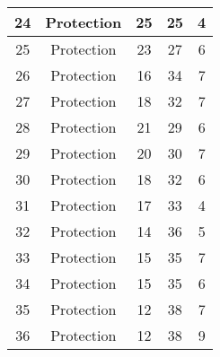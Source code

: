 \documentclass[results.tex]{subfiles}
\begin{document}
\begin{center}
\begin{tabular}{| c || c | c | c | c |}
            \hline
            24                      & Protection                   & 25                     & 25                      & 4                    \\
            \hline
            25                      & Protection                   & 23                     & 27                      & 6                    \\
            \hline
            26                      & Protection                   & 16                     & 34                      & 7                    \\
            \hline
            27                      & Protection                   & 18                     & 32                      & 7                    \\
            \hline
            28                      & Protection                   & 21                     & 29                      & 6                    \\
            \hline
            29                      & Protection                   & 20                     & 30                      & 7                    \\
            \hline
            30                      & Protection                   & 18                     & 32                      & 6                    \\
            \hline
            31                      & Protection                   & 17                     & 33                      & 4                    \\
            \hline
            32                      & Protection                   & 14                     & 36                      & 5                    \\
            \hline
            33                      & Protection                   & 15                     & 35                      & 7                    \\
            \hline
            34                      & Protection                   & 15                     & 35                      & 6                    \\
            \hline
            35                      & Protection                   & 12                     & 38                      & 7                    \\
            \hline
            36                      & Protection                   & 12                     & 38                      & 9                    \\

\end{tabular}
\end{center}
\end{document}
